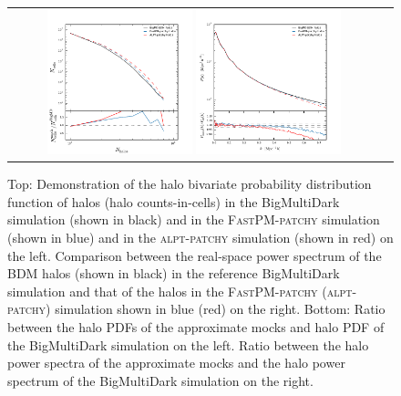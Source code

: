 \begin{figure}
 \begin{tabular}{cc}
\includegraphics[width=0.4\textwidth]{figures/mocks/pdf.pdf}
\includegraphics[width=0.4\textwidth]{figures/mocks/pk.pdf}
\end{tabular}
\caption{\label{fig:pdfpower} Top: Demonstration of the halo bivariate probability distribution function of halos (halo counts-in-cells) in the BigMultiDark simulation (shown in black) and in the \textsc{FastPM}-\textsc{patchy} simulation (shown in blue) and in the \textsc{alpt}-\textsc{patchy} simulation (shown in red) on the left. Comparison between the real-space power spectrum of the BDM halos (shown in black) in the reference BigMultiDark simulation and that of the halos in the \textsc{FastPM}-\textsc{patchy} (\textsc{alpt}-\textsc{patchy}) simulation shown in blue (red) on the right. 
Bottom: Ratio between the halo PDFs of the approximate mocks and halo PDF of the BigMultiDark simulation on the left. Ratio between the halo power spectra of the approximate mocks and the halo power spectrum of the BigMultiDark simulation on the right.}
\end{figure}

